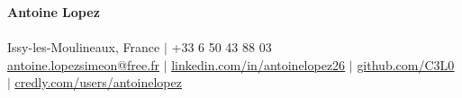 \documentclass[letterpaper,10pt]{article}
\begin{document}
\begin{center}
    {\Huge \textbf{Antoine Lopez}} \\ \vspace{2pt}
    {\large \textbf{
    }} \\ \vspace{3pt}
    \small
    Issy-les-Moulineaux, France $|$ +33 6 50 43 88 03 \\
    \href{mailto:antoine.lopezsimeon@free.fr}{\underline{antoine.lopezsimeon@free.fr}} $|$ 
    \href{https://linkedin.com/in/antoinelopez26}{\underline{linkedin.com/in/antoinelopez26}} $|$
    \href{https://github.com/C3L0}{\underline{github.com/C3L0}} $|$
    \href{https://www.credly.com/users/antoinelopez26}{\underline{credly.com/users/antoinelopez}}
\end{center}


\vspace{-10pt}







\end{document}
